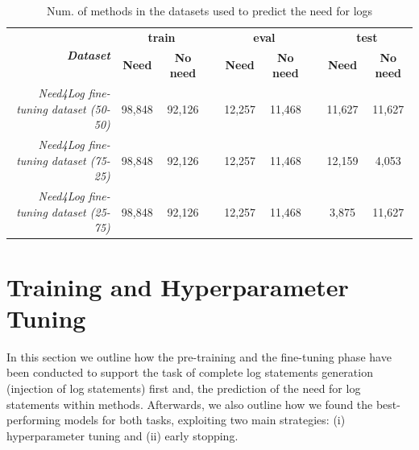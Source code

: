 \begin{table}[h!]
	\centering
	\caption{Num. of methods in the datasets used to predict the need for logs}
	\begin{tabular}{rcccccccc}
		\hline
		\multirow{2}{*}{\textit{\textbf{Dataset}}} & \multicolumn{2}{c}{\textbf{train}} & \textbf{} & \multicolumn{2}{c}{\textbf{eval}}  & \textbf{} & \multicolumn{2}{c}{\textbf{test}}  \\ \cline{2-3} \cline{5-6} \cline{8-9} 
		& \textbf{Need} & \textbf{No need}   & \textbf{} & \textbf{Need} & \textbf{No need}   & \textbf{} & \textbf{Need} & \textbf{No need}   \\ \hline
		\textit{Need4Log fine-tuning dataset (50-50)}         & 98,848        & 92,126             &           & 12,257        & 11,468             &           & 11,627        &  11,627            \\
		\textit{Need4Log fine-tuning dataset (75-25)}         & 98,848        & 92,126             &           & 12,257        & 11,468             &           & 12,159        &  4,053             \\
		\textit{Need4Log fine-tuning dataset (25-75)}         & 98,848        & 92,126             &           & 12,257        & 11,468             &           & 3,875         &  11,627            \\ \hline
	\end{tabular}
	\label{tab:ds-summary-2}
\end{table}

\section{Training and Hyperparameter Tuning} \label{sec:training}
In this section we outline how the pre-training and the fine-tuning phase have been conducted to support the task of complete log statements generation (\ie injection of log statements) first and, the prediction of the need for log statements within \java methods. Afterwards, we also outline how we found the best-performing models for both tasks, exploiting two main strategies: (i) hyperparameter tuning  and (ii) early stopping.

